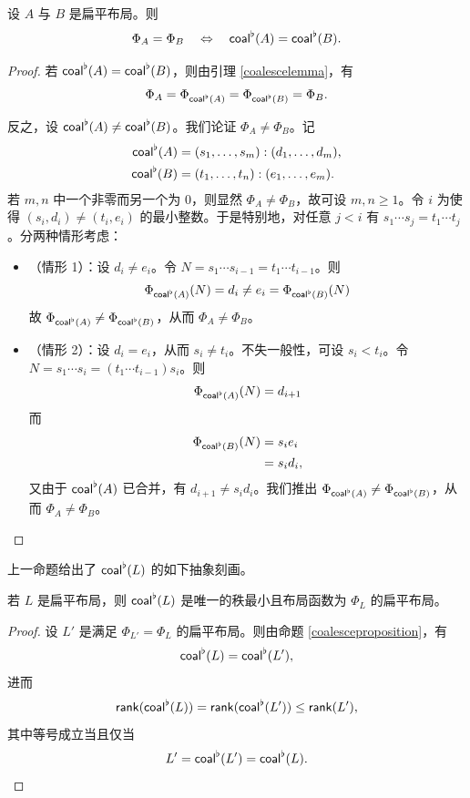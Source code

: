 \begin{proposition} \label{coalesceproposition}
    设 $A$ 与 $B$ 是扁平布局。则
    \[
    \Phi_A = \Phi_B \quad \Leftrightarrow \quad \mathsf{coal}^\flat(A) = \mathsf{coal}^\flat(B).
    \]
\end{proposition}
\begin{proof}
    若 $\mathsf{coal}^\flat(A) = \mathsf{coal}^\flat(B)$，则由引理 \ref{coalescelemma}，有
    \[ \Phi_A = \Phi_{\mathsf{coal}^\flat(A)} = \Phi_{\mathsf{coal}^\flat(B)} = \Phi_B.\]

    \noindent 反之，设 $\mathsf{coal}^\flat(A) \neq \mathsf{coal}^\flat(B)$。我们论证 $\Phi_A \neq \Phi_B$。记
    \begin{align*}
    \mathsf{coal}^\flat(A) & = (s_1,\dots,s_m) : (d_1,\dots,d_m)\text{,} \\
    \mathsf{coal}^\flat(B) & = (t_1,\dots,t_n) : (e_1,\dots,e_m).
    \end{align*}
    若 $m,n$ 中一个非零而另一个为 $0$，则显然 $\Phi_A \neq \Phi_B$，故可设 $m,n\geq 1$。令 $i$ 为使得 $(s_i,d_i) \neq (t_i,e_i)$ 的最小整数。于是特别地，对任意 $j < i$ 有 $s_1 \cdots s_j = t_1 \cdots t_j$。分两种情形考虑：\\

    \begin{itemize}
    \item （情形 1）：设 $d_i \neq e_i$。令 $N = s_1 \cdots s_{i-1} = t_1 \cdots t_{i-1}$。则
        \[
        \Phi_{\mathsf{coal}^\flat(A)}(N) = d_i \neq e_i = \Phi_{\mathsf{coal}^\flat(B)}(N)
        \]
        故 $\Phi_{\mathsf{coal}^\flat(A)} \neq \Phi_{\mathsf{coal}^\flat(B)}$，从而 $\Phi_A \neq \Phi_B$。\\

     \item （情形 2）：设 $d_i = e_i$，从而 $s_i \neq t_i$。不失一般性，可设 $s_i < t_i$。令 $N = s_1 \cdots s_i = (t_1 \cdots t_{i-1}) s_i$。则
        \[
        \Phi_{\mathsf{coal}^\flat(A)}(N)= d_{i+1}
        \]
        而
        \begin{align*}
        \Phi_{\mathsf{coal}^\flat(B)}(N) & = s_ie_i\\
        & = s_id_i,
        \end{align*}
        又由于 $\mathsf{coal}^\flat(A)$ 已合并，有 $d_{i+1} \neq s_id_i$。我们推出 $\Phi_{\mathsf{coal}^\flat(A)} \neq \Phi_{\mathsf{coal}^\flat(B)}$，从而 $\Phi_A \neq \Phi_B$。
    \end{itemize}
\end{proof}

上一命题给出了 $\mathsf{coal}^\flat(L)$ 的如下抽象刻画。

\begin{proposition}\label{characterizationofflatcoalesce}
    若 $L$ 是扁平布局，则 $\mathsf{coal}^\flat(L)$ 是唯一的秩最小且布局函数为 $\Phi_L$ 的扁平布局。
\end{proposition}

\begin{proof}
    设 $L'$ 是满足 $\Phi_{L'} = \Phi_L$ 的扁平布局。则由命题 \ref{coalesceproposition}，有
    \[
    \mathsf{coal}^\flat(L) = \mathsf{coal}^\flat(L'),
    \]
    进而
    \[
    \mathsf{rank}(\mathsf{coal}^\flat(L)) = \mathsf{rank}(\mathsf{coal}^\flat(L')) \leq \mathsf{rank}(L'),
    \]
    其中等号成立当且仅当
    \[
    L ' = \mathsf{coal}^\flat (L') = \mathsf{coal}^\flat(L).
    \]
\end{proof}
